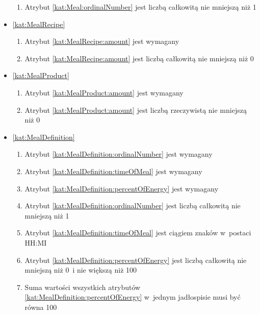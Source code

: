 \begin{itemize}[label={\textbf{Ograniczenia dla}}, wide, labelwidth=!, labelindent=0pt]
\begin{enumerate}[label={\textbf{OGR/\protect\threedigits{\arabic{enumi}}}}, wide, labelwidth=!, align=left, leftmargin=3cm, resume]
        \item Atrybut \ref{kat:Meal:ordinalNumber} jest liczbą całkowitą nie mniejszą niż 1
    \end{enumerate}

    \item\ref{kat:MealRecipe}
    \begin{enumerate}[label={\textbf{OGR/\protect\threedigits{\arabic{enumi}}}}, wide, labelwidth=!, align=left, leftmargin=3cm, resume]
        \item Atrybut \ref{kat:MealRecipe:amount} jest wymagany

        \item Atrybut \ref{kat:MealRecipe:amount} jest liczbą całkowitą nie mniejszą niż 0
    \end{enumerate}

    \item\ref{kat:MealProduct}
    \begin{enumerate}[label={\textbf{OGR/\protect\threedigits{\arabic{enumi}}}}, wide, labelwidth=!, align=left, leftmargin=3cm, resume]
        \item Atrybut \ref{kat:MealProduct:amount} jest wymagany

        \item Atrybut \ref{kat:MealProduct:amount} jest liczbą rzeczywistą nie mniejszą niż 0
    \end{enumerate}

    \item\ref{kat:MealDefinition}
    \begin{enumerate}[label={\textbf{OGR/\protect\threedigits{\arabic{enumi}}}}, wide, labelwidth=!, align=left, leftmargin=3cm, resume]
        \item Atrybut \ref{kat:MealDefinition:ordinalNumber} jest wymagany
        \item Atrybut \ref{kat:MealDefinition:timeOfMeal} jest wymagany
        \item Atrybut \ref{kat:MealDefinition:percentOfEnergy} jest wymagany

        \item Atrybut \ref{kat:MealDefinition:ordinalNumber} jest liczbą całkowitą nie mniejszą niż 1
        \item Atrybut \ref{kat:MealDefinition:timeOfMeal} jest ciągiem znaków w~postaci HH:MI
        \item Atrybut \ref{kat:MealDefinition:percentOfEnergy} jest liczbą całkowitą nie mniejszą niż 0~i nie większą niż 100
        \item Suma wartości wszystkich atrybutów \ref{kat:MealDefinition:percentOfEnergy} w~jednym jadłospisie musi być równa 100
    \end{enumerate}


\end{itemize}
